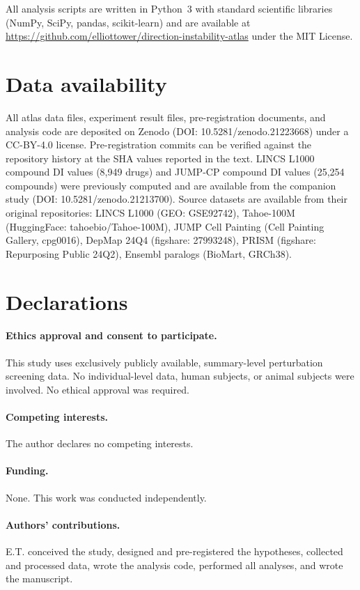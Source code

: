 \documentclass[11pt]{article}
\begin{document}
All analysis scripts are written in Python~3 with standard scientific
libraries (NumPy, SciPy, pandas, scikit-learn) and are available at
\url{https://github.com/elliottower/direction-instability-atlas} under
the MIT License.

\section*{Data availability}

All atlas data files, experiment result files, pre-registration documents, and analysis code are deposited on Zenodo (DOI: 10.5281/zenodo.21223668) under a CC-BY-4.0 license. Pre-registration commits can be verified against the repository history at the SHA values reported in the text. LINCS L1000 compound DI values (8,949 drugs) and JUMP-CP compound DI values (25,254 compounds) were previously computed and are available from the companion study (DOI: 10.5281/zenodo.21213700). Source datasets are available from their original repositories: LINCS L1000 (GEO: GSE92742), Tahoe-100M (HuggingFace: tahoebio/Tahoe-100M), JUMP Cell Painting (Cell Painting Gallery, cpg0016), DepMap 24Q4 (figshare: 27993248), PRISM (figshare: Repurposing Public 24Q2), Ensembl paralogs (BioMart, GRCh38).

\section*{Declarations}

\paragraph{Ethics approval and consent to participate.}
This study uses exclusively publicly available, summary-level perturbation screening data. No individual-level data, human subjects, or animal subjects were involved. No ethical approval was required.

\paragraph{Competing interests.}
The author declares no competing interests.

\paragraph{Funding.}
None. This work was conducted independently.

\paragraph{Authors' contributions.}
E.T. conceived the study, designed and pre-registered the hypotheses, collected and processed data, wrote the analysis code, performed all analyses, and wrote the manuscript.
\end{document}
